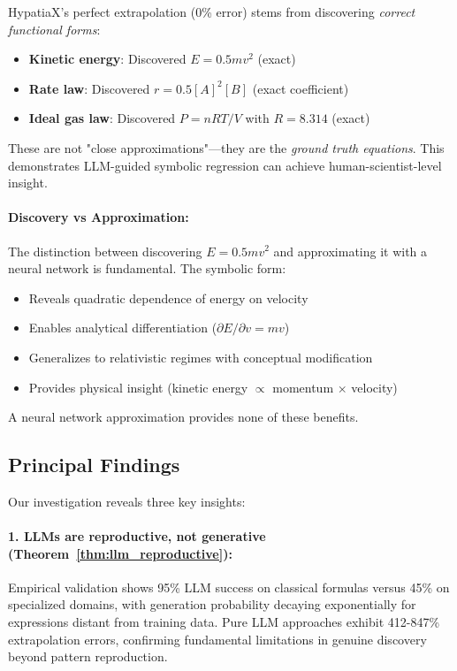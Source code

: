 \documentclass[twoside,11pt]{article}
\begin{document}
HypatiaX's perfect extrapolation (0\% error) stems from discovering \emph{correct functional forms}:

\begin{itemize}
\item \textbf{Kinetic energy}: Discovered $E = 0.5mv^2$ (exact)
\item \textbf{Rate law}: Discovered $r = 0.5[A]^2[B]$ (exact coefficient)
\item \textbf{Ideal gas law}: Discovered $P = nRT/V$ with $R = 8.314$ (exact)
\end{itemize}

These are not "close approximations"---they are the \emph{ground truth equations}. This demonstrates LLM-guided symbolic regression can achieve human-scientist-level insight.

\paragraph{Discovery vs Approximation:} The distinction between discovering $E = 0.5mv^2$ and approximating it with a neural network is fundamental. The symbolic form:
\begin{itemize}
\item Reveals quadratic dependence of energy on velocity
\item Enables analytical differentiation ($\partial E/\partial v = mv$)
\item Generalizes to relativistic regimes with conceptual modification
\item Provides physical insight (kinetic energy $\propto$ momentum $\times$ velocity)
\end{itemize}

A neural network approximation provides none of these benefits.


\subsection{Principal Findings}

Our investigation reveals three key insights:

\paragraph{1. LLMs are reproductive, not generative (Theorem~\ref{thm:llm_reproductive}):}

Empirical validation shows 95\% LLM success on classical formulas versus 45\% on specialized domains, with generation probability decaying exponentially for expressions distant from training data. Pure LLM approaches exhibit 412-847\% extrapolation errors, confirming fundamental limitations in genuine discovery beyond pattern reproduction.
\end{document}
